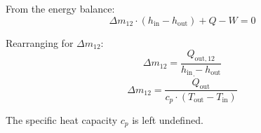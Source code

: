 From the energy balance:  
\[
\Delta m_{12} \cdot (h_{\text{in}} - h_{\text{out}}) + Q - W = 0
\]  

Rearranging for \( \Delta m_{12} \):  
\[
\Delta m_{12} = \frac{Q_{\text{out},12}}{h_{\text{in}} - h_{\text{out}}}
\]  
\[
\Delta m_{12} = \frac{\dot{Q}_{\text{out}}}{c_p \cdot (T_{\text{out}} - T_{\text{in}})}
\]  

The specific heat capacity \( c_p \) is left undefined.